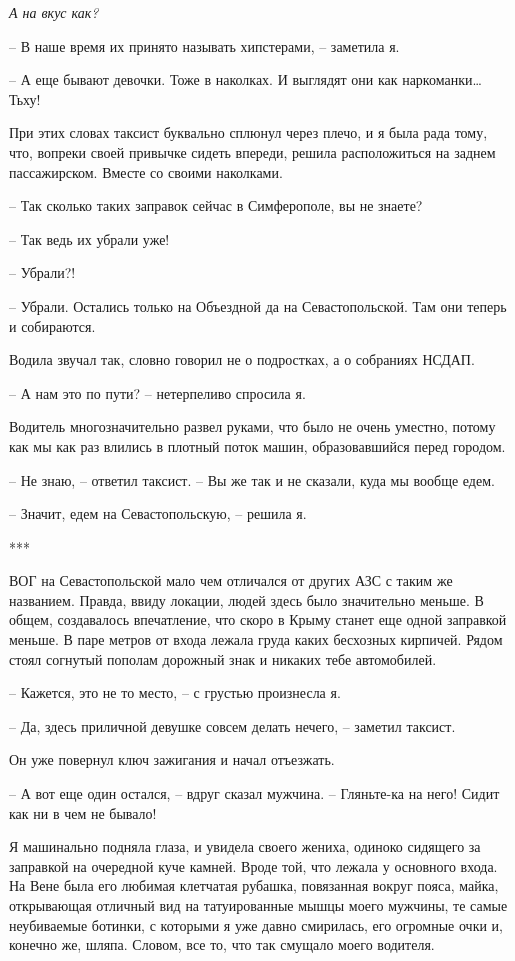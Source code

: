 \documentclass[
]{book}
\begin{document}
\emph{А на вкус как?}

-- В наше время их принято называть хипстерами, -- заметила я.

-- А еще бывают девочки. Тоже в наколках. И выглядят они как наркоманки\ldots{} Тьху!

При этих словах таксист буквально сплюнул через плечо, и я была рада тому, что, вопреки своей привычке сидеть впереди, решила расположиться на заднем пассажирском. Вместе со своими наколками.

-- Так сколько таких заправок сейчас в Симферополе, вы не знаете?

-- Так ведь их убрали уже!

-- Убрали?!

-- Убрали. Остались только на Объездной да на Севастопольской. Там они теперь и собираются.

Водила звучал так, словно говорил не о подростках, а о собраниях НСДАП.

-- А нам это по пути? -- нетерпеливо спросила я.

Водитель многозначительно развел руками, что было не очень уместно, потому как мы как раз влились в плотный поток машин, образовавшийся перед городом.

-- Не знаю, -- ответил таксист. -- Вы же так и не сказали, куда мы вообще едем.

-- Значит, едем на Севастопольскую, -- решила я.

***

ВОГ на Севастопольской мало чем отличался от других АЗС с таким же названием. Правда, ввиду локации, людей здесь было значительно меньше. В общем, создавалось впечатление, что скоро в Крыму станет еще одной заправкой меньше. В паре метров от входа лежала груда каких бесхозных кирпичей. Рядом стоял согнутый пополам дорожный знак и никаких тебе автомобилей.

-- Кажется, это не то место, -- с грустью произнесла я.

-- Да, здесь приличной девушке совсем делать нечего, -- заметил таксист.

Он уже повернул ключ зажигания и начал отъезжать.

-- А вот еще один остался, -- вдруг сказал мужчина. -- Гляньте-ка на него! Сидит как ни в чем не бывало!

Я машинально подняла глаза, и увидела своего жениха, одиноко сидящего за заправкой на очередной куче камней. Вроде той, что лежала у основного входа. На Вене была его любимая клетчатая рубашка, повязанная вокруг пояса, майка, открывающая отличный вид на татуированные мышцы моего мужчины, те самые неубиваемые ботинки, с которыми я уже давно смирилась, его огромные очки и, конечно же, шляпа. Словом, все то, что так смущало моего водителя.
\end{document}
